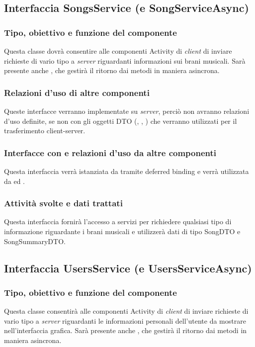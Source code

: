 \subsection{Interfaccia SongsService (e SongServiceAsync)}
\subsubsection*{Tipo, obiettivo e funzione del componente}
Questa classe dovr\`a consentire alle componenti Activity di \emph{client} di
inviare richieste di vario tipo a \emph{server} riguardanti informazioni sui
brani musicali. Sar\`a presente anche , che gestir\`a il ritorno
dai metodi in maniera asincrona.

\subsubsection*{Relazioni d'uso di altre componenti}
Queste interfacce verranno implementate su \emph{server}, perci\`o non
avranno relazioni d'uso definite, se non con gli oggetti DTO
(, , ) che verranno
utilizzati per il trasferimento client-server.

\subsubsection*{Interfacce con e relazioni d'uso da altre componenti}
Questa interfaccia verr\`a istanziata da  tramite deferred
binding e verr\`a utilizzata da  ed .

\subsubsection*{Attivit\`a svolte e dati trattati}
Questa interfaccia fornir\`a l'accesso a servizi per richiedere qualsiasi tipo
di informazione riguardante i brani musicali e utilizzer\`a dati di tipo SongDTO
e SongSummaryDTO.

\subsection{Interfaccia UsersService (e UsersServiceAsync)}
\subsubsection*{Tipo, obiettivo e funzione del componente}
Questa classe consentir\`a alle componenti Activity di \emph{client} di inviare
richieste di vario tipo a \emph{server} riguardanti le informazioni personali
dell'utente da mostrare  nell'interfaccia grafica. Sar\`a presente anche
, che gestir\`a il ritorno dai metodi in maniera asincrona.

